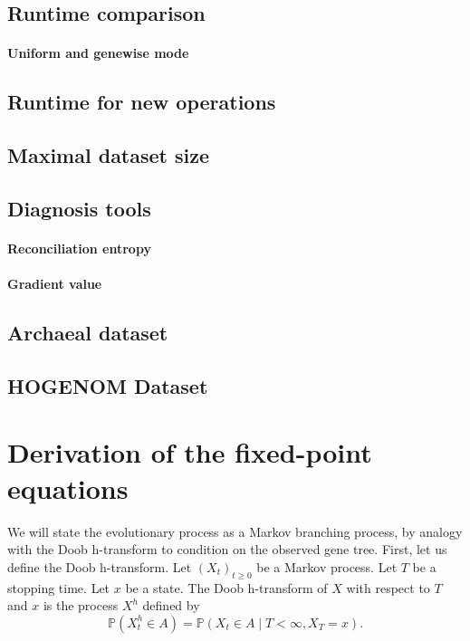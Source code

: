 \documentclass{article}
\newcommand{\1}{\mathbf{1}}
\newcommand{\Pbb}{\mathbb{P}}
\begin{document}
\subsection{Runtime comparison}
\paragraph{Uniform and genewise mode}

\subsection{Runtime for new operations}

\subsection{Maximal dataset size}

\subsection{Diagnosis tools}
\paragraph{Reconciliation entropy}

\paragraph{Gradient value}

\paragraph{}

\subsection{Archaeal dataset}

\subsection{HOGENOM Dataset}

\appendix

\section{Derivation of the fixed-point equations}
We will state the evolutionary process as a Markov branching process, by analogy with the Doob h-transform to condition on the observed gene tree. First, let us define the Doob h-transform. Let $(X_t)_{t\ge0}$ be a Markov process. Let $T$ be a stopping time. Let $x$ be a state. The Doob h-transform of $X$ with respect to $T$ and $x$ is the process $X^h$ defined by
\[
    \Pbb(X^h_t\in A)
    =
    \Pbb(X_t\in A\mid T<\infty, X_T=x).
\]
\end{document}
